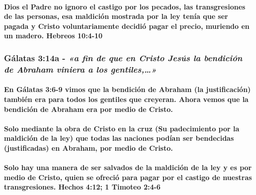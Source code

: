\documentclass[11a pt,twoside]{article}
\newcommand{\scripture}[1]{%
  {\fontsize{12pt}{16pt}\selectfont\ScriptureFont\itshape #1}%
}
\let\oldsubsubsection\subsubsection
\renewcommand{\subsubsection}{\needspace{4\baselineskip}\oldsubsubsection}
\let\oldparagraph\paragraph
\renewcommand{\paragraph}{\needspace{3\baselineskip}\oldparagraph}
\begin{document}
\paragraph{Dios el Padre no ignoro el castigo por los pecados, las
transgresiones de las personas, esa maldición mostrada por la ley tenía
que ser pagada y Cristo voluntariamente decidió pagar el precio,
muriendo en un madero. Hebreos
10:4-10}\label{dios-el-padre-no-ignoro-el-castigo-por-los-pecados-las-transgresiones-de-las-personas-esa-maldiciuxf3n-mostrada-por-la-ley-tenuxeda-que-ser-pagada-y-cristo-voluntariamente-decidiuxf3-pagar-el-precio-muriendo-en-un-madero.-hebreos-104-10}

\subsubsection{\texorpdfstring{Gálatas 3:14a -
\scripture{«a fin de que en Cristo Jesús la bendición de Abraham viniera a los gentiles,…»}}{Gálatas 3:14a - }}\label{guxe1latas-314a---a-fin-de-que-en-cristo-jesuxfas-la-bendiciuxf3n-de-abraham-viniera-a-los-gentiles}

\paragraph{En Gálatas 3:6-9 vimos que la bendición de Abraham (la
justificación) también era para todos los gentiles que creyeran. Ahora
vemos que la bendición de Abraham era por medio de
Cristo.}\label{en-guxe1latas-36-9-vimos-que-la-bendiciuxf3n-de-abraham-la-justificaciuxf3n-tambiuxe9n-era-para-todos-los-gentiles-que-creyeran.-ahora-vemos-que-la-bendiciuxf3n-de-abraham-era-por-medio-de-cristo.}

\paragraph{Solo mediante la obra de Cristo en la cruz (Su padecimiento
por la maldición de la ley) que todas las naciones podían ser bendecidas
(justificadas) en Abraham, por medio de
Cristo.}\label{solo-mediante-la-obra-de-cristo-en-la-cruz-su-padecimiento-por-la-maldiciuxf3n-de-la-ley-que-todas-las-naciones-poduxedan-ser-bendecidas-justificadas-en-abraham-por-medio-de-cristo.}

\paragraph{Solo hay una manera de ser salvados de la maldición de la ley
y es por medio de Cristo, quien se ofreció para pagar por el castigo de
nuestras transgresiones. Hechos 4:12; 1 Timoteo
2:4-6}\label{solo-hay-una-manera-de-ser-salvados-de-la-maldiciuxf3n-de-la-ley-y-es-por-medio-de-cristo-quien-se-ofreciuxf3-para-pagar-por-el-castigo-de-nuestras-transgresiones.-hechos-412-1-timoteo-24-6}
\end{document}
